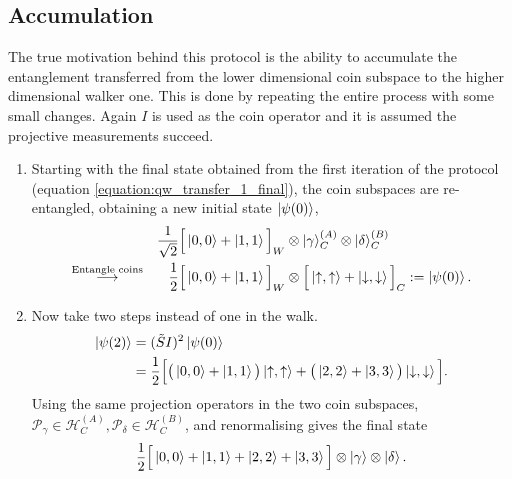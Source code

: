 \subsection{Accumulation}
\label{subsection:qw_accumulation}
The true motivation behind this protocol is the ability to accumulate the entanglement transferred from the lower dimensional coin subspace to the higher dimensional walker one.
This is done by repeating the entire process with some small changes.
Again $I$ is used as the coin operator and it is assumed the projective measurements succeed.
\begin{enumerate}

    \item Starting with the final state obtained from the first iteration of the protocol (equation \ref{equation:qw_transfer_1_final}), the coin subspaces are re-entangled, obtaining a new initial state $\ket{\psi(0)}$,
    \begin{alignat}{3}
        &&\frac{1}{\sqrt{2}}
        \Big [\ket{0, 0} + \ket{1, 1}\Big ]_W&\otimes \ket{\gamma}^{(A)}_C \otimes \ket{\delta}^{(B)}_C\\
        \overset{\text{Entangle coins}}{\longrightarrow}
        &&\frac{1}{2}\Big [\ket{0, 0} + \ket{1, 1}\Big ]_W &\otimes
        \Big [\ket{\uparrow, \uparrow} + \ket{\downarrow, \downarrow}\Big ]_C := \ket{\psi(0)}.
    \end{alignat}
    \item Now take two steps instead of one in the walk.
    \begin{align}
        \ket{\psi(2)} &= (\tilde{S}I)^2\ket{\psi(0)}\\
        &= \frac{1}{2}\Big[\big (\ket{0,0}+\ket{1,1}\big )\ket{\uparrow,\uparrow} + \big (\ket{2,2} + \ket{3,3}\big )\ket{\downarrow,\downarrow}\Big ].
    \end{align}
     Using the same projection operators in the two coin subspaces, $\mathcal{P}_\gamma \in \mathcal{H}^{(A)}_C,  \mathcal{P}_\delta \in \mathcal{H}^{(B)}_C$, and renormalising gives the final state
    \begin{equation}
        \frac{1}{2}\Big[\ket{0,0} + \ket{1,1} + \ket{2,2} + \ket{3,3}\Big ] \otimes \ket{\gamma}\otimes\ket{\delta}.
    \end{equation}
\end{enumerate}

